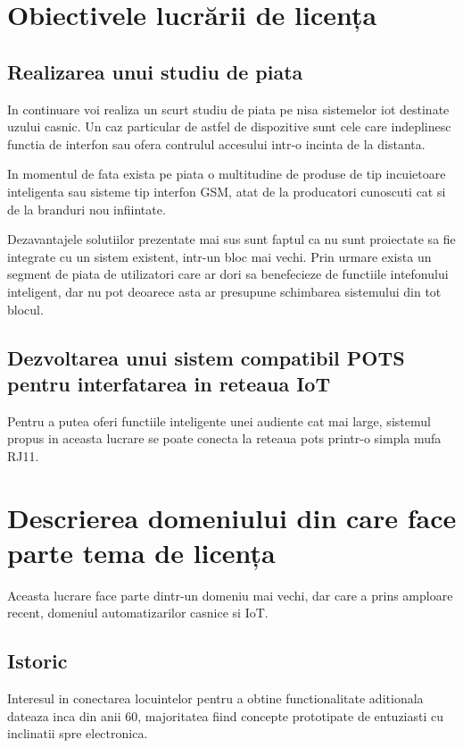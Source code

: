 \section {Obiectivele lucrării de licența}

\subsection {Realizarea unui studiu de piata}

In continuare voi realiza un scurt studiu de piata pe nisa sistemelor \acrfull{iot} destinate uzului casnic. Un caz particular de astfel de dispozitive sunt cele care indeplinesc functia de interfon sau ofera contrulul accesului intr-o incinta de la distanta.

In momentul de fata exista pe piata o multitudine de produse de tip incuietoare inteligenta sau sisteme tip interfon GSM, atat de la producatori cunoscuti cat si de la branduri nou infiintate.

Dezavantajele solutiilor prezentate mai sus sunt faptul ca nu sunt proiectate sa fie integrate cu un sistem existent, intr-un bloc mai vechi. Prin urmare exista un segment de piata de utilizatori care ar dori sa benefecieze de functiile intefonului inteligent, dar nu pot deoarece asta ar presupune schimbarea sistemului din tot blocul.

\subsection {Dezvoltarea unui sistem compatibil POTS pentru interfatarea in reteaua IoT}

Pentru a putea oferi functiile inteligente unei audiente cat mai large, sistemul propus in aceasta lucrare se poate conecta la reteaua \acrfull{pots} printr-o simpla mufa RJ11.

\section {Descrierea domeniului din care face parte tema de licența}

Aceasta lucrare face parte dintr-un domeniu mai vechi, dar care a prins amploare recent, domeniul automatizarilor casnice si IoT. 

\subsection {Istoric}

Interesul in conectarea locuintelor pentru a obtine functionalitate aditionala dateaza inca din anii 60, majoritatea fiind concepte prototipate de entuziasti cu inclinatii spre electronica.

